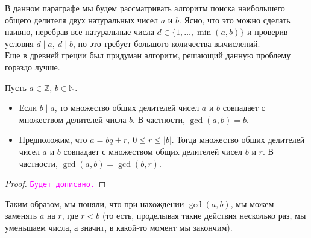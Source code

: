 \documentclass[11pt]{article}
\begin{document}
	В данном параграфе мы будем рассматривать алгоритм поиска наибольшего общего делителя двух натуральных чисел $a$ и $b$.
	Ясно, что это можно сделать наивно, перебрав все натуральные числа $d \in \{ 1, \ldots, \min(a, b) \}$ и проверив условия $d \mid a, \ d \mid b$, но
	это требует большого количества вычислений.\\
	Еще в древней греции был придуман алгоритм, решающий данную проблему гораздо лучше.

	\begin{lemma}\label{EuclidAlgorithmLemma}  Пусть $a \in \mathbb{Z}$, $b \in \mathbb{N}$.
		\begin{itemize}

			\item Если $b \mid a$, то множество общих делителей чисел $a$ и $b$ совпадает с множеством
			делителей числа $b$. В частности, $\gcd(a, b) = b$.

			\item Предположим, что $a = bq + r, \ 0 \le r \le |b|$. Тогда множество общих делителей чисел $a$ и $b$ совпадает с множеством
				  общих делителей чисел $b$ и $r$. В частности, $\gcd(a, b) = \gcd(b, r)$.
		\end{itemize}

	\end{lemma}
	\begin{proof}
		\textcolor{magenta}{\texttt{Будет дописано.}}
	\end{proof}
	Таким образом, мы поняли, что при нахождении $\gcd(a, b)$, мы можем заменять $a$ на $r$, где $r < b$ (то есть, проделывая
	такие действия несколько раз, мы уменьшаем числа, а значит, в какой-то момент мы закончим).
\end{document}
